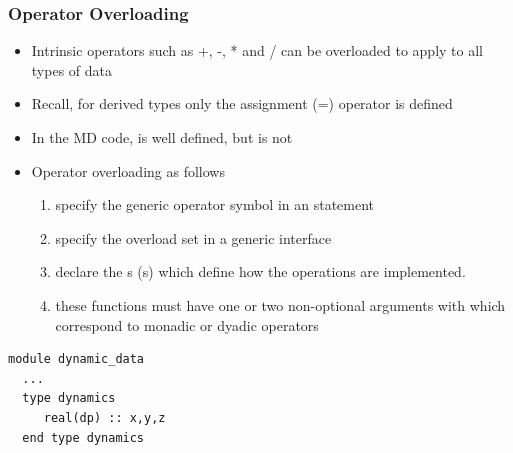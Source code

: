 \documentclass[10pt,t]{beamer}
\begin{document}
\begin{frame}
  \frametitle{\small Operator Overloading}
  \begin{itemize}
    \item Intrinsic operators such as +, -, * and / can be overloaded to apply to all types of data
    \item Recall, for derived types only the assignment (=) operator is defined
    \item In the MD code,  is well defined, but  is not
    \item Operator overloading as follows
    \begin{enumerate}
      \item specify the generic operator symbol in an  statement
      \item specify the overload set in a generic interface
      \item declare the s (s) which define how the operations are implemented.
      \item these functions must have one or two non-optional arguments with  which correspond to monadic or dyadic operators
    \end{enumerate}
  \end{itemize}
  \framebreak
  \begin{lstlisting}[language={[90]Fortran},basicstyle=\fontsize{5}{6}\selectfont\ttfamily,multicols=2]
module dynamic_data
  ...
  type dynamics
     real(dp) :: x,y,z
  end type dynamics


\end{lstlisting}
\end{frame}
\end{document}
